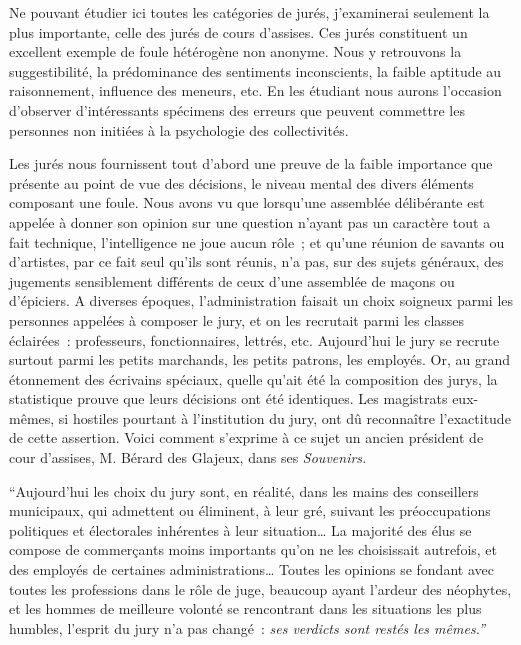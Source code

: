 \documentclass[french,twoside]{book} %
\begin{document}
\noindent Ne pouvant étudier ici toutes les catégories de jurés, j’examinerai seulement la plus importante, celle des jurés de cours d’assises. Ces jurés constituent un excellent exemple de foule hétérogène non anonyme. Nous y retrouvons la suggestibilité, la prédominance des sentiments inconscients, la faible aptitude au raisonnement, influ­ence des meneurs, etc. En les étudiant nous aurons l’occasion d’observer d’intéres­sants spécimens des erreurs que peuvent commettre les personnes non initiées à la psychologie des collectivités.\par
Les jurés nous fournissent tout d’abord une preuve de la faible importance que présente au point de vue des décisions, le niveau mental des divers éléments compo­sant une foule. Nous avons vu que lorsqu’une assemblée délibérante est appelée à donner son opinion sur une question n’ayant pas un caractère tout a fait technique, l’intelligence ne joue aucun rôle ; et qu’une réunion de savants ou d’artistes, par ce fait seul qu’ils sont réunis, n’a pas, sur des sujets généraux, des jugements sensiblement différents de ceux d’une assemblée de maçons ou d’épiciers. A diverses époques, l’administration faisait un choix soigneux parmi les personnes appelées à composer le jury, et on les recrutait parmi les classes éclairées : professeurs, fonctionnaires, lettrés, etc. Aujourd’hui le jury se recrute surtout parmi les petits marchands, les petits patrons, les employés. Or, au grand étonnement des écrivains spéciaux, quelle qu’ait été la composition des jurys, la statistique prouve que leurs décisions ont été iden­tiques. Les magistrats eux-mêmes, si hostiles pourtant à l’institution du jury, ont dû reconnaître l’exactitude de cette assertion. Voici comment s’exprime à ce sujet un ancien président de cour d’assises, M. Bérard des Glajeux, dans ses \emph{Souvenirs.}\par
“Aujourd’hui les choix du jury sont, en réalité, dans les mains des conseillers municipaux, qui admettent ou éliminent, à leur gré, suivant les préoccupations poli­tiques et électorales inhérentes à leur situation… La majorité des élus se compose de commerçants moins importants qu’on ne les choisissait autrefois, et des employés de certaines administrations… Toutes les opinions se fondant avec toutes les professions dans le rôle de juge, beaucoup ayant l’ardeur des néophytes, et les hommes de meil­leure volonté se rencontrant dans les situations les plus humbles, l’esprit du jury n’a pas changé : \emph{ses verdicts sont restés les mêmes.”}\par
\end{document}
